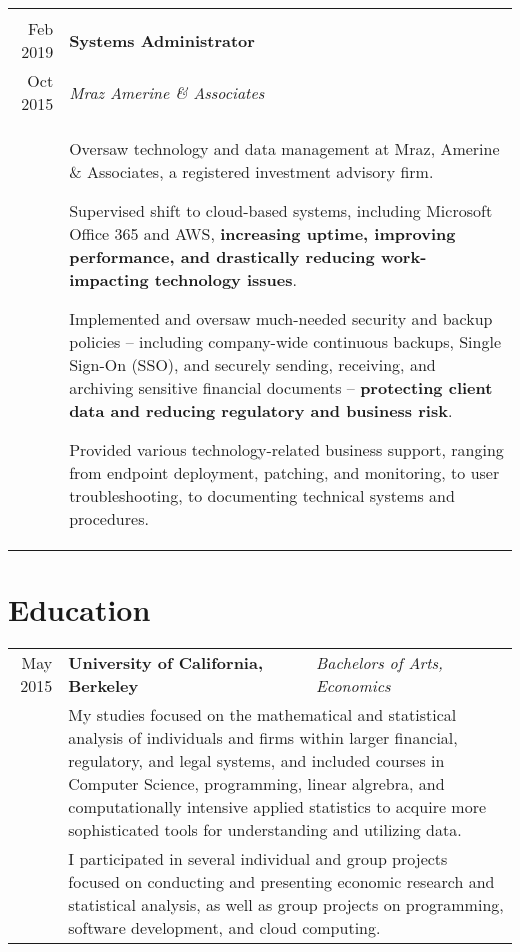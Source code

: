 \documentclass[10pt]{article}
\newcommand{\afterlistspace}[0]{\vspace{-1.5em}}
\begin{document}
\begin{tabular}{r|p{16cm}}
    \\
    \multicolumn{2}{c}{}
    \\

    Feb 2019 & \textbf{Systems Administrator}
    \\
    Oct 2015 & \emph{Mraz Amerine \& Associates}
    \\
    & \begin{itemize}
        \footnotesize{
            \item Oversaw technology and data management at Mraz, Amerine \& Associates, a registered investment advisory firm.
            
            \item Supervised shift to cloud-based systems, including Microsoft Office 365 and AWS, \textbf{increasing uptime, improving performance, and drastically reducing work-impacting technology issues}.
            
            \item Implemented and oversaw much-needed security and backup policies -- including company-wide continuous backups, Single Sign-On (SSO), and securely sending, receiving, and archiving sensitive financial documents -- \textbf{protecting client data and reducing regulatory and business risk}.

            \item Provided various technology-related business support, ranging from endpoint deployment, patching, and monitoring, to user troubleshooting, to documenting technical systems and procedures.
        }

        \afterlistspace
    \end{itemize}

\end{tabular}


\section{Education}

\begin{tabular}{r|l|p{16cm}}
    May 2015 & \textbf{University of California, Berkeley} & \emph{Bachelors of Arts, Economics}
    \\
    & \multicolumn{2}{p{16cm}}{\footnotesize{My studies focused on the mathematical and statistical analysis of individuals and firms within larger financial, regulatory, and legal systems, and included courses in Computer Science, programming, linear algrebra, and computationally intensive applied statistics to acquire more sophisticated tools for understanding and utilizing data.}}
    \\
    & \multicolumn{2}{p{16cm}}{\footnotesize{I participated in several individual and group projects focused on conducting and presenting economic research and statistical analysis, as well as group projects on programming, software development, and cloud computing.}}
\end{tabular}
\end{document}
